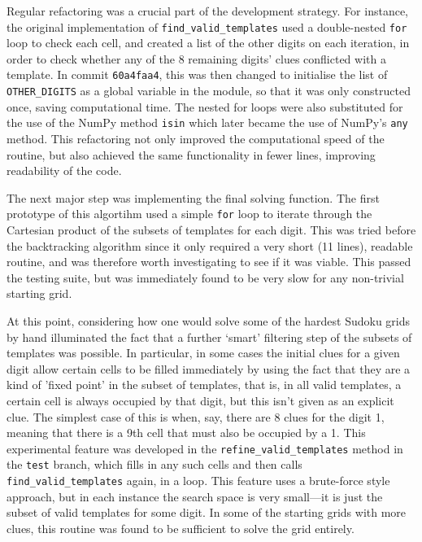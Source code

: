 \documentclass[12pt]{article}
\begin{document}
Regular refactoring was a crucial part of the development strategy.
For instance, the original implementation of \texttt{find\_valid\_templates} used a double-nested \texttt{for} loop to check each cell, and created a list of the other digits on each iteration, in order to check whether any of the 8 remaining digits' clues conflicted with a template.
In commit \texttt{60a4faa4}, this was then changed to initialise the list of \texttt{OTHER\_DIGITS} as a global variable in the module, so that it was only constructed once, saving computational time.
The nested for loops were also substituted for the use of the NumPy method \texttt{isin} which later became the use of NumPy's \texttt{any} method.
This refactoring not only improved the computational speed of the routine, but also achieved the same functionality in fewer lines, improving readability of the code.

The next major step was implementing the final solving function.
The first prototype of this algortihm used a simple \texttt{for} loop to iterate through the Cartesian product of the subsets of templates for each digit.
This was tried before the backtracking algorithm since it only required a very short (11 lines), readable routine, and was therefore worth investigating to see if it was viable.
This passed the testing suite, but was immediately found to be very slow for any non-trivial starting grid.

At this point, considering how one would solve some of the hardest Sudoku grids by hand illuminated the fact that a further `smart' filtering step of the subsets of templates was possible.
In particular, in some cases the initial clues for a given digit allow certain cells to be filled immediately by using the fact that they are a kind of 'fixed point' in the subset of templates, that is, in all valid templates, a certain cell is always occupied by that digit, but this isn't given as an explicit clue.
The simplest case of this is when, say, there are 8 clues for the digit 1, meaning that there is a 9th cell that must also be occupied by a 1.
This experimental feature was developed in the \texttt{refine\_valid\_templates} method in the \texttt{test} branch, which fills in any such cells and then calls \texttt{find\_valid\_templates} again, in a loop.
This feature uses a brute-force style approach, but in each instance the search space is very small---it is just the subset of valid templates for some digit.
In some of the starting grids with more clues, this routine was found to be sufficient to solve the grid entirely.
\end{document}
